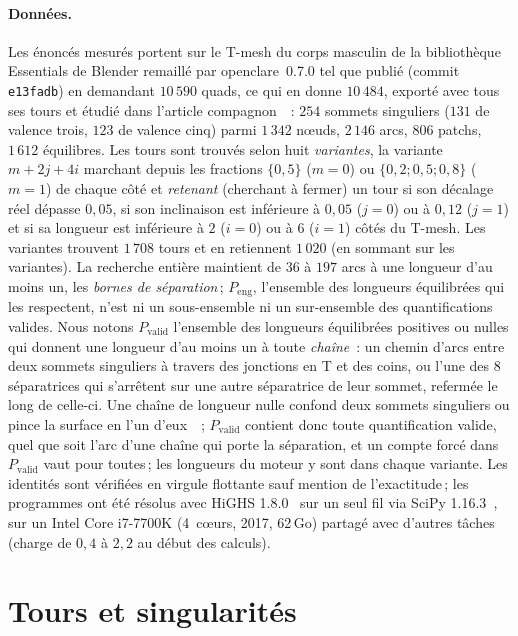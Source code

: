 \documentclass[11pt,a4paper]{article}
\begin{document}
\paragraph{Données.}
Les énoncés mesurés portent sur le T-mesh du corps masculin de la
bibliothèque Essentials de Blender remaillé par openclare~0.7.0 tel que
publié (commit \texttt{e13fadb}) en demandant $10\,590$ quads, ce qui en
donne $10\,484$, exporté avec tous ses tours et étudié dans l'article
compagnon~\cite[\S7]{gardent2026loops}~: $254$ sommets singuliers ($131$ de
valence trois, $123$ de valence cinq) parmi $1\,342$ nœuds, $2\,146$ arcs,
$806$ patchs, $1\,612$ équilibres. Les tours sont
trouvés selon huit \emph{variantes}, la variante $m + 2j + 4i$ marchant depuis
les fractions $\{0,5\}$ ($m = 0$) ou $\{0,2 ; 0,5 ; 0,8\}$ ($m = 1$) de chaque
côté et \emph{retenant} (cherchant à fermer) un tour si son décalage réel
dépasse $0,05$, si son inclinaison est inférieure à $0,05$ ($j = 0$) ou à
$0,12$ ($j = 1$) et si sa longueur est inférieure à $2$ ($i = 0$) ou à $6$ ($i
= 1$) côtés du T-mesh. Les variantes
trouvent $1\,708$ tours et en retiennent $1\,020$ (en sommant sur les
variantes). La recherche entière maintient de $36$ à $197$ arcs à une longueur
d'au moins un, les \emph{bornes de séparation}\,; $P_{\mathrm{eng}}$,
l'ensemble des longueurs équilibrées qui les respectent, n'est ni un
sous-ensemble ni un sur-ensemble des quantifications valides. Nous notons
$P_{\mathrm{valid}}$ l'ensemble des longueurs équilibrées positives ou nulles
qui donnent une longueur d'au moins un à toute \emph{chaîne}~: un chemin
d'arcs entre deux sommets singuliers à travers des jonctions en T et des
coins, ou l'une des $8$ séparatrices qui s'arrêtent sur une autre séparatrice
de leur sommet, refermée le long de celle-ci. Une chaîne de longueur nulle
confond deux sommets singuliers ou pince la surface en l'un
d'eux~\cite[\S4.1]{lyon2021constrained}~; $P_{\mathrm{valid}}$ contient donc
toute quantification valide, quel que soit l'arc d'une chaîne qui porte la
séparation, et un compte forcé dans $P_{\mathrm{valid}}$ vaut pour toutes\,;
les longueurs du moteur y sont dans chaque variante. Les identités sont vérifiées en virgule flottante sauf
mention de l'exactitude\,; les programmes ont été résolus avec HiGHS
1.8.0~\cite{huangfu2018highs} sur un seul fil via SciPy
1.16.3~\cite{virtanen2020scipy}, sur un Intel Core i7-7700K (4~cœurs, 2017,
62\,Go) partagé avec d'autres tâches (charge de $0,4$ à $2,2$ au début des
calculs).

\section{Tours et singularités}\label{sec:holonomy}
\end{document}
